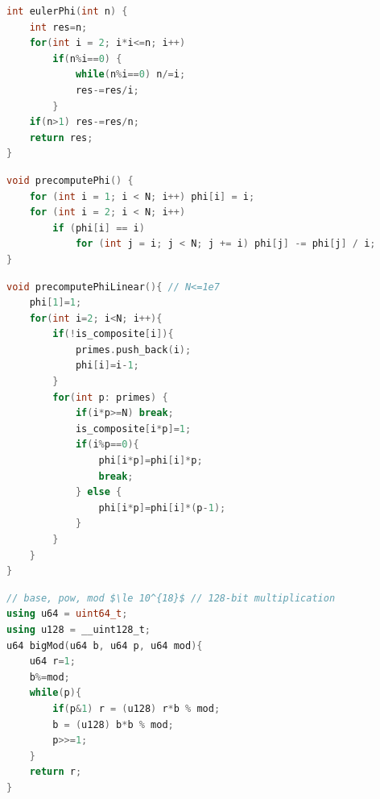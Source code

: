 \begin{lstlisting}[language=C++]
int eulerPhi(int n) {
    int res=n;
    for(int i = 2; i*i<=n; i++)
        if(n%i==0) {
            while(n%i==0) n/=i;
            res-=res/i;
        }
    if(n>1) res-=res/n;
    return res;
}
\end{lstlisting}

\begin{lstlisting}[language=C++]
void precomputePhi() {
    for (int i = 1; i < N; i++) phi[i] = i;
    for (int i = 2; i < N; i++)
        if (phi[i] == i)
            for (int j = i; j < N; j += i) phi[j] -= phi[j] / i;
}
\end{lstlisting}
\begin{lstlisting}[language=C++]
void precomputePhiLinear(){ // N<=1e7
    phi[1]=1;
    for(int i=2; i<N; i++){
        if(!is_composite[i]){
            primes.push_back(i);
            phi[i]=i-1;
        }
        for(int p: primes) {
            if(i*p>=N) break;
            is_composite[i*p]=1;
            if(i%p==0){
                phi[i*p]=phi[i]*p;
                break;
            } else {
                phi[i*p]=phi[i]*(p-1);
            }
        }
    }
}
\end{lstlisting}

\begin{lstlisting}[language=C++, mathescape=true]
// base, pow, mod $\le 10^{18}$ // 128-bit multiplication
using u64 = uint64_t;
using u128 = __uint128_t;
u64 bigMod(u64 b, u64 p, u64 mod){
    u64 r=1;
    b%=mod;
    while(p){
        if(p&1) r = (u128) r*b % mod;
        b = (u128) b*b % mod;
        p>>=1;
    }
    return r;
}
\end{lstlisting}

